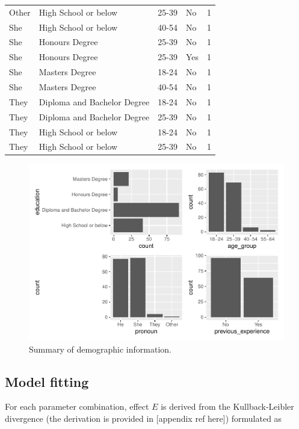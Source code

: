 \documentclass[]{interact}
\theoremstyle{plain}%
\theoremstyle{definition}
\theoremstyle{remark}
\begin{document}
\begin{table}
\begin{tabular}[t]{llllr}
Other & High School or below & 25-39 & No & 1\\
She & High School or below & 40-54 & No & 1\\
She & Honours Degree & 25-39 & No & 1\\
She & Honours Degree & 25-39 & Yes & 1\\
She & Masters Degree & 18-24 & No & 1\\
She & Masters Degree & 40-54 & No & 1\\
They & Diploma and Bachelor Degree & 18-24 & No & 1\\
They & Diploma and Bachelor Degree & 25-39 & No & 1\\
They & High School or below & 18-24 & No & 1\\
They & High School or below & 25-39 & No & 1\\
\bottomrule
\end{tabular}
\end{table}

\begin{figure}
\centering
\includegraphics{paper_comparison_files/figure-latex/demographic-summary-plot-1.pdf}
\caption{Summary of demographic information.
\label{fig:demographic-summary-plot}}
\end{figure}

\hypertarget{model-fitting}{%
\subsection{Model fitting}\label{model-fitting}}

For each parameter combination, effect \(E\) is derived from the
Kullback-Leibler divergence (the derivation is provided in {[}appendix
ref here{]}) formulated as
\end{document}
